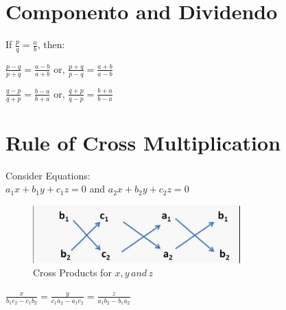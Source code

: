 \documentclass[11pt,a4paper,landscape]{article}
\begin{document}
\begin{multicols*}{3}
\section{Componento and Dividendo}
	If $\frac{p}{q}=\frac{a}{b}$, then:
	\begin{description}
	\item $\frac{p-q}{p+q}=\frac{a-b}{a+b}$ or, $\frac{p+q}{p-q}=\frac{a+b}{a-b}$
	\item $\frac{q-p}{q+p}=\frac{b-a}{b+a}$ or, $\frac{q+p}{q-p}=\frac{b+a}{b-a}$
	\end{description}
\section{Rule of Cross Multiplication}
	Consider Equations:\\
	$a_1x+b_1y+c_1z=0$ and $a_2x+b_2y+c_2z=0$\\
	\begin{figure}[H]
		\centering
		\includegraphics[width=8cm]{maxresdefault2.png}
		\caption{Cross Products for $x,y\,and\,z$}
	\end{figure}
	\begin{center}
	$\frac{x}{b_1c_2-c_1b_2}=\frac{y}{c_1a_2-a_1c_2}=\frac{z}{a_1b_2-b_1a_2}$ 
	\end{center}
	\vfill\null
\end{multicols*}
\end{document}
